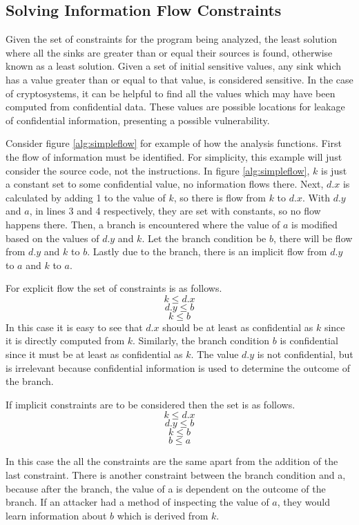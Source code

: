 \subsection{Solving Information Flow Constraints}
Given the set of constraints for the program being analyzed, the least solution
where all the sinks are greater than or equal their sources is found, otherwise
known as a least solution. Given a set of initial sensitive values, any sink
which has a value greater than or equal to that value, is considered sensitive.
In the case of cryptosystems, it can be helpful to find all the values which
may have been computed from confidential data. These values are possible
locations for leakage of confidential information, presenting a possible
vulnerability.


Consider figure \ref{alg:simpleflow} for example of how the analysis functions.
First the flow of information must be identified. For simplicity, this example
will just consider the source code, not the instructions. In figure
\ref{alg:simpleflow}, $k$ is just a constant set to some confidential value, no
information flows there. Next, $d.x$ is calculated by adding 1 to the value of
$k$, so there is flow from $k$ to $d.x$. With $d.y$ and $a$, in lines 3 and 4
respectively, they are set with constants, so no flow happens there. Then, a
branch is encountered where the value of $a$ is modified based on the values of
$d.y$ and $k$. Let the branch condition be $b$, there will be flow from $d.y$
and $k$ to $b$. Lastly due to the branch, there is an implicit flow from $d.y$
to $a$ and $k$ to $a$.

For explicit flow the set of constraints is as follows.
\[
  k \leq d.x
\]
\[
  d.y \leq b
\]
\[
  k \leq b
\]
In this case it is easy to see that $d.x$ should be at least as confidential as $k$
since it is directly computed from $k$. Similarly, the branch condition $b$ is
confidential since it must be at least as confidential as $k$. The value $d.y$
is not confidential, but is irrelevant because confidential information is used
to determine the outcome of the branch. 

If implicit constraints are to be considered then the set is as follows.
\[
  k \leq d.x
\]
\[
  d.y \leq b
\]
\[
  k \leq b
\]
\[
  b \leq a
\]

In this case the all the constraints are the same apart from the addition of the
last constraint. There is another constraint between the branch condition and a,
because after the branch, the value of a is dependent on the outcome of the
branch. If an attacker had a method of inspecting the value of $a$, they would
learn information about $b$ which is derived from $k$.

